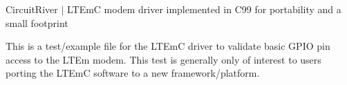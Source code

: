 Circuit\+River $\vert$ LTEmC modem driver implemented in C99 for portability and a small footprint

This is a test/example file for the LTEmC driver to validate basic GPIO pin access to the LTEm modem. This test is generally only of interest to users porting the LTEmC software to a new framework/platform. 